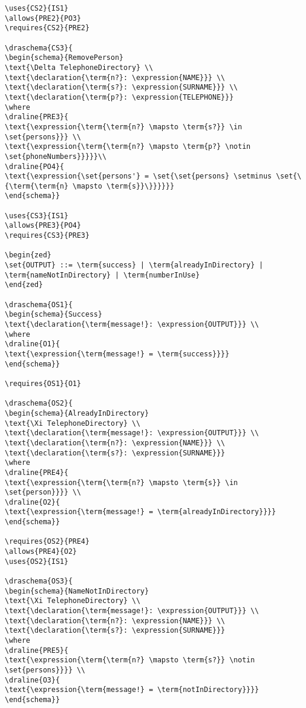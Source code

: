 \begin{verbatim}
\uses{CS2}{IS1}
\allows{PRE2}{PO3}
\requires{CS2}{PRE2}

\draschema{CS3}{
\begin{schema}{RemovePerson}
\text{\Delta TelephoneDirectory} \\
\text{\declaration{\term{n?}: \expression{NAME}}} \\
\text{\declaration{\term{s?}: \expression{SURNAME}}} \\
\text{\declaration{\term{p?}: \expression{TELEPHONE}}}
\where
\draline{PRE3}{
\text{\expression{\term{\term{n?} \mapsto \term{s?}} \in \set{persons}}} \\
\text{\expression{\term{\term{n?} \mapsto \term{p?} \notin \set{phoneNumbers}}}}}\\
\draline{PO4}{
\text{\expression{\set{persons'} = \set{\set{persons} \setminus \set{\{\term{\term{n} \mapsto \term{s}}\}}}}}}
\end{schema}}

\uses{CS3}{IS1}
\allows{PRE3}{PO4}
\requires{CS3}{PRE3}

\begin{zed}
\set{OUTPUT} ::= \term{success} | \term{alreadyInDirectory} | \term{nameNotInDirectory} | \term{numberInUse}
\end{zed}

\draschema{OS1}{
\begin{schema}{Success}
\text{\declaration{\term{message!}: \expression{OUTPUT}}} \\
\where
\draline{O1}{
\text{\expression{\term{message!} = \term{success}}}}
\end{schema}}

\requires{OS1}{O1}

\draschema{OS2}{
\begin{schema}{AlreadyInDirectory}
\text{\Xi TelephoneDirectory} \\
\text{\declaration{\term{message!}: \expression{OUTPUT}}} \\
\text{\declaration{\term{n?}: \expression{NAME}}} \\
\text{\declaration{\term{s?}: \expression{SURNAME}}}
\where
\draline{PRE4}{
\text{\expression{\term{\term{n?} \mapsto \term{s}} \in \set{person}}}} \\
\draline{O2}{
\text{\expression{\term{message!} = \term{alreadyInDirectory}}}}
\end{schema}}

\requires{OS2}{PRE4}
\allows{PRE4}{O2}
\uses{OS2}{IS1}

\draschema{OS3}{
\begin{schema}{NameNotInDirectory}
\text{\Xi TelephoneDirectory} \\
\text{\declaration{\term{message!}: \expression{OUTPUT}}} \\
\text{\declaration{\term{n?}: \expression{NAME}}} \\
\text{\declaration{\term{s?}: \expression{SURNAME}}}
\where
\draline{PRE5}{
\text{\expression{\term{\term{n?} \mapsto \term{s?}} \notin \set{persons}}}} \\
\draline{O3}{
\text{\expression{\term{message!} = \term{notInDirectory}}}}
\end{schema}}


\end{verbatim}
